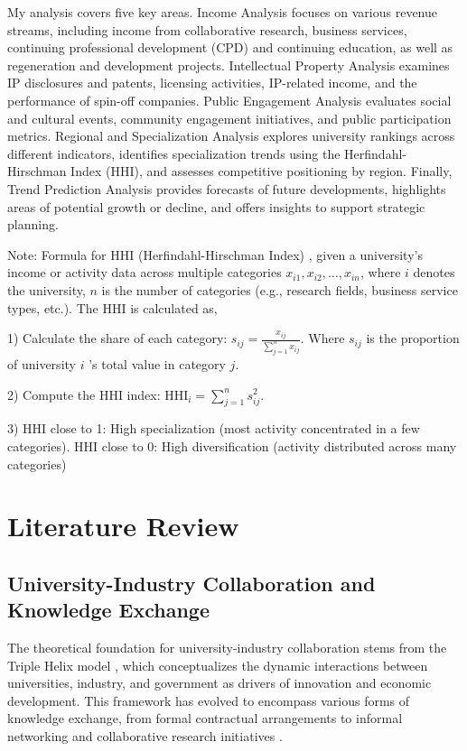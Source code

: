 \documentclass[journal,onecolumn, 10pt,draftclsnofoot]{IEEEtran}
\begin{document}
My analysis covers five key areas. Income Analysis focuses on various revenue streams, including income from collaborative research, business services, continuing professional development (CPD) and continuing education, as well as regeneration and development projects. Intellectual Property Analysis examines IP disclosures and patents, licensing activities, IP-related income, and the performance of spin-off companies. Public Engagement Analysis evaluates social and cultural events, community engagement initiatives, and public participation metrics. Regional and Specialization Analysis explores university rankings across different indicators, identifies specialization trends using the Herfindahl-Hirschman Index (HHI), and assesses competitive positioning by region. Finally, Trend Prediction Analysis provides forecasts of future developments, highlights areas of potential growth or decline, and offers insights to support strategic planning.

Note: Formula for HHI (Herfindahl-Hirschman Index) \cite{hirschman1945national,herfindahl1950concentration}, given a university's income or activity data across multiple categories $x_{i 1}, x_{i 2}, \ldots, x_{i n}$, where $i$ denotes the university, $n$ is the number of categories (e.g., research fields, business service types, etc.). The HHI is calculated as,

1) Calculate the share of each category: $s_{i j}=\frac{x_{i j}}{\sum_{j=1}^n x_{i j}}$. Where $s_{i j}$ is the proportion of university $i$ 's total value in category $j$.

2) Compute the HHI index: $\mathrm{HHI}_i=\sum_{j=1}^n s_{i j}^2$.

3) HHI close to 1: High specialization (most activity concentrated in a few categories). HHI close to 0: High diversification (activity distributed across many categories)

\section{Literature Review}

\subsection{University-Industry Collaboration and Knowledge Exchange}

The theoretical foundation for university-industry collaboration stems from the Triple Helix model \cite{etzkowitz2000dynamics}, which conceptualizes the dynamic interactions between universities, industry, and government as drivers of innovation and economic development. This framework has evolved to encompass various forms of knowledge exchange, from formal contractual arrangements to informal networking and collaborative research initiatives \cite{perkmann2013academic}.
\end{document}
